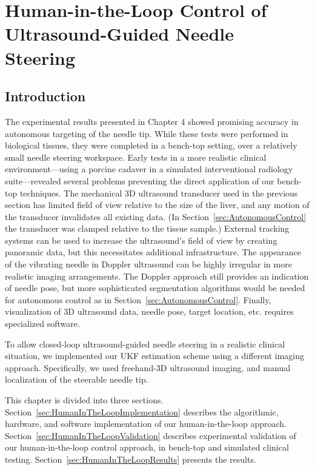 \chapter[Human-in-the-Loop Control]{Human-in-the-Loop Control of Ultrasound-Guided Needle Steering}

\section{Introduction}
The experimental results presented in Chapter 4 showed promising accuracy in autonomous targeting of the needle tip. While these tests were performed in biological tissues, they were completed in a bench-top setting, over a relatively small needle steering workspace. Early tests in a more realistic clinical environment---using a porcine cadaver in a simulated interventional radiology suite---revealed several problems preventing the direct application of our bench-top techniques. The mechanical 3D ultrasound transducer used in the previous section has limited field of view relative to the size of the liver, and any motion of the transducer invalidates all existing data. (In Section~\ref{sec:AutonomousControl} the transducer was clamped relative to the tissue sample.) External tracking systems can be used to increase the ultrasound's field of view by creating panoramic data, but this necessitates additional infrastructure. The appearance of the vibrating needle in Doppler ultrasound can be highly irregular in more realistic imaging arrangements. The Doppler approach still provides an indication of needle pose, but more sophisticated segmentation algorithms would be needed for autonomous control as in Section~\ref{sec:AutonomousControl}. Finally, visualization of 3D ultrasound data, needle pose, target location, etc. requires specialized software.

To allow closed-loop ultrasound-guided needle steering in a realistic clinical situation, we implemented our UKF estimation scheme using a different imaging approach. Specifically, we used freehand-3D ultrasound imaging, and manual localization of the steerable needle tip. 

This chapter is divided into three sections. Section~\ref{sec:HumanInTheLoopImplementation} describes the algorithmic, hardware, and software implementation of our human-in-the-loop approach. Section~\ref{sec:HumanInTheLoopValidation} describes experimental validation of our human-in-the-loop control approach, in bench-top and simulated clinical testing. Section~\ref{sec:HumanInTheLoopResults} presents the results.

